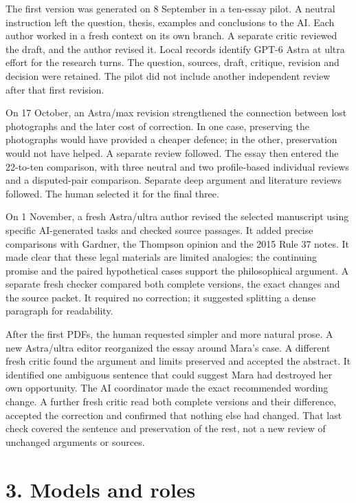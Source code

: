 The first version was generated on 8 September in a ten-essay pilot. A neutral instruction left the question, thesis, examples and conclusions to the AI. Each author worked in a fresh context on its own branch. A separate critic reviewed the draft, and the author revised it. Local records identify GPT-6 Astra at ultra effort for the research turns. The question, sources, draft, critique, revision and decision were retained. The pilot did not include another independent review after that first revision.

On 17 October, an Astra/max revision strengthened the connection between lost photographs and the later cost of correction. In one case, preserving the photographs would have provided a cheaper defence; in the other, preservation would not have helped. A separate review followed. The essay then entered the 22-to-ten comparison, with three neutral and two profile-based individual reviews and a disputed-pair comparison. Separate deep argument and literature reviews followed. The human selected it for the final three.

On 1 November, a fresh Astra/ultra author revised the selected manuscript using specific AI-generated tasks and checked source passages. It added precise comparisons with Gardner, the Thompson opinion and the 2015 Rule 37 notes. It made clear that these legal materials are limited analogies: the continuing promise and the paired hypothetical cases support the philosophical argument. A separate fresh checker compared both complete versions, the exact changes and the source packet. It required no correction; it suggested splitting a dense paragraph for readability.

After the first PDFs, the human requested simpler and more natural prose. A new Astra/ultra editor reorganized the essay around Mara's case. A different fresh critic found the argument and limits preserved and accepted the abstract. It identified one ambiguous sentence that could suggest Mara had destroyed her own opportunity. The AI coordinator made the exact recommended wording change. A further fresh critic read both complete versions and their difference, accepted the correction and confirmed that nothing else had changed. That last check covered the sentence and preservation of the rest, not a new review of unchanged arguments or sources.

\section*{3. Models and roles}

